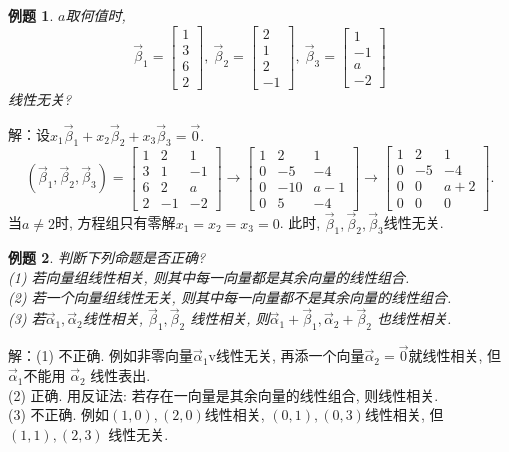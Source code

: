 \documentclass[a4paper]{book}
\newtheorem{eg}{例题}[chapter]
\begin{document}
\begin{eg}
$a$取何值时, $$\vec{\beta}_1=\begin{bmatrix}1\\3\\6\\2\end{bmatrix},\  \vec{\beta}_2=\begin{bmatrix}2\\1\\2\\-1\end{bmatrix},\
\vec{\beta}_3=\begin{bmatrix}1\\-1\\a\\-2\end{bmatrix}$$线性无关?
\end{eg}
解：设$x_1\vec{\beta}_1+x_2\vec{\beta}_2+x_3\vec{\beta}_3=\vec{0}.$
\begin{displaymath}
(\vec{\beta}_1,\vec{\beta}_2,\vec{\beta}_3)=\begin{bmatrix}1&2&1\\3&1&-1\\6&2&
a\\2&-1&-2\end{bmatrix}\rightarrow\begin{bmatrix}1&2&1\\0&-5&-4\\0&-10&a-1\\0&5 &-4\end{bmatrix}\rightarrow\begin{bmatrix}1&2&1\\0&-5&-4\\0&0&a+2\\0&0&0\end{bmatrix}.
\end{displaymath}
当$a\not=2$时, 方程组只有零解$x_1=x_2=x_3=0$. 此时, $\vec{\beta}_1,\vec{\beta}_2,\vec{\beta}_3$线性无关.

\begin{eg}
判断下列命题是否正确?\\
(1) 若向量组线性相关, 则其中每一向量都是其余向量的线性组合.\\
(2) 若一个向量组线性无关,  则其中每一向量都不是其余向量的线性组合.\\
(3) 若$\vec{\alpha}_1,\vec{\alpha}_2$线性相关, $\vec{\beta}_1,\vec{\beta}_2$ 线性相关, 则$\vec{\alpha}_1+\vec{\beta}_1, \vec{\alpha}_2+\vec{\beta}_2$ 也线性相关.
\end{eg}
解：(1) 不正确. 例如非零向量$\vec{\alpha}_1$v线性无关, 再添一个向量$\vec{\alpha}_2=\vec{0}$就线性相关, 但$\vec{\alpha}_1$不能用 $\vec{\alpha}_2$ 线性表出.\\
(2) 正确. 用反证法: 若存在一向量是其余向量的线性组合,  则线性相关.\\
(3) 不正确. 例如$(1,0),(2,0)$线性相关, $(0,1),(0,3)$线性相关, 但$(1,1),(2,3)$ 线性无关.
\end{document}
